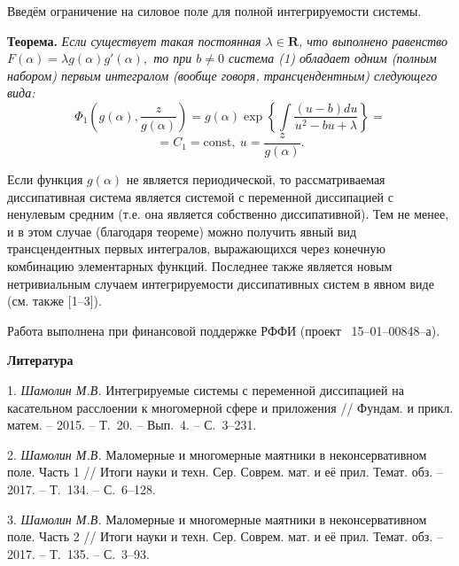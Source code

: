 Введём ограничение на силовое поле для полной интегрируемости
системы.

\textbf{Теорема.} {\it
Если существует такая постоянная
$\lambda\in\mathbf{R}$, что выполнено равенство
$
F(\alpha)=\lambda g(\alpha)g'(\alpha),
$
то при $b\ne 0$ система (1) обладает одним (полным набором) первым
интегралом (вообще говоря, трансцендентным) следующего вида:
$$
\Phi_1\left(g(\alpha),\frac{z}{g(\alpha)}\right)=g(\alpha)\exp\left\{\int\frac{(u-b)du}{u^2-bu+\lambda}\right\}=
$$
$$=C_1=\textrm{const},~u=\frac{z}{g(\alpha)}.$$
}

Если функция $g(\alpha)$ не является периодической, то
рассматриваемая диссипативная система является системой с переменной
диссипацией с ненулевым средним (т.е. она является собственно
диссипативной). Тем не менее, и в этом случае (благодаря теореме)
можно получить явный вид трансцендентных первых интегралов,
выражающихся через конечную комбинацию элементарных функций.
Последнее также является новым нетривиальным случаем интегрируемости
диссипативных систем в явном виде (см. также [1--3]).




Работа выполнена при финансовой поддержке РФФИ (проект
\No~15--01--00848--а).


\smallskip \centerline{\bf Литература}\nopagebreak


1. {\it Шамолин М.В.} Интегрируемые системы с переменной диссипацией
на касательном расслоении к многомерной сфере и приложения //
Фундам. и прикл. матем. -- 2015. -- Т.~20. -- Вып.~4. -- С.~3--231.

2. {\it Шамолин М.В.} Маломерные и многомерные маятники в
неконсервативном поле. Часть 1 // Итоги науки и техн. Сер. Соврем.
мат. и её прил. Темат. обз. -- 2017. -- Т.~134. -- С.~6--128.

3. {\it Шамолин М.В.} Маломерные и многомерные маятники в
неконсервативном поле. Часть 2 // Итоги науки и техн. Сер. Соврем.
мат. и её прил. Темат. обз. -- 2017. -- Т.~135. -- С.~3--93.








